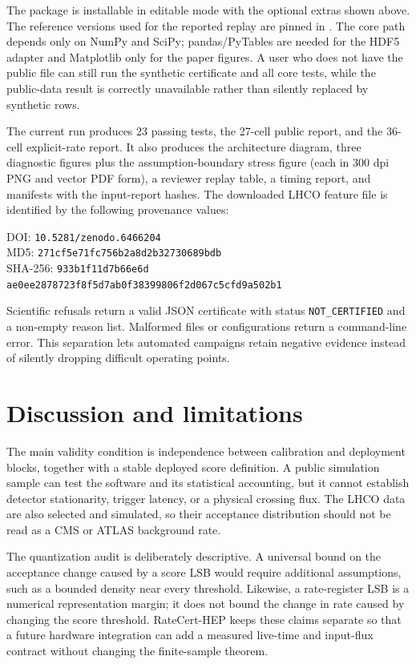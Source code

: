 \documentclass[submission, Phys]{SciPost}
\begin{document}
The package is installable in editable mode with the optional extras shown
above.  The reference versions used for the reported replay are pinned in
.  The core path depends only on NumPy and SciPy;
pandas/PyTables are needed for the HDF5 adapter and Matplotlib only for the
paper figures.  A user
who does not have the public file can still run the synthetic certificate and
all core tests, while the public-data result is correctly unavailable rather
than silently replaced by synthetic rows.

The current run produces 23 passing tests, the 27-cell public report, and the
36-cell explicit-rate report.  It also produces the architecture diagram,
three diagnostic figures plus the assumption-boundary stress figure (each in
300 dpi PNG and vector PDF form), a reviewer replay table, a timing report,
and manifests with the input-report hashes.  The downloaded
LHCO feature file is identified by the
following provenance values:
\begin{center}\small
DOI: \verb|10.5281/zenodo.6466204|\\
MD5: \verb|271cf5e71fc756b2a8d2b32730689bdb|\\
SHA-256: \texttt{933b1f11d7b66e6d}\allowbreak
\texttt{ae0ee2878723f8f5d7ab0f38399806f2d067c5cfd9a502b1}
\end{center}

Scientific refusals return a valid JSON certificate with status
\verb|NOT_CERTIFIED| and a non-empty reason list.  Malformed files or configurations
return a command-line error.  This separation lets automated campaigns retain
negative evidence instead of silently dropping difficult operating points.

\section{Discussion and limitations}
\label{sec:discussion}

The main validity condition is independence between calibration and deployment
blocks, together with a stable deployed score definition.  A public simulation
sample can test the software and its statistical accounting, but it cannot
establish detector stationarity, trigger latency, or a physical crossing flux.
The LHCO data are also selected and simulated, so their acceptance distribution
should not be read as a CMS or ATLAS background rate.

The quantization audit is deliberately descriptive.  A universal bound on the
acceptance change caused by a score LSB would require additional assumptions,
such as a bounded density near every threshold.  Likewise, a rate-register LSB
is a numerical representation margin; it does not bound the change in rate
caused by changing the score threshold.  RateCert-HEP keeps these claims
separate so that a future hardware integration can add a measured live-time and
input-flux contract without changing the finite-sample theorem.
\end{document}
